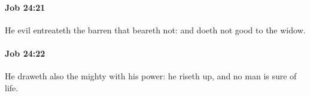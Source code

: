		\paragraph{Job 24:21} %
			\label{JOB-24-21}

			He evil entreateth the barren that beareth not: and doeth not good to the widow.


		\paragraph{Job 24:22} %
			\label{JOB-24-22}

			He draweth also the mighty with his power: he riseth up, and no man is sure of life.


